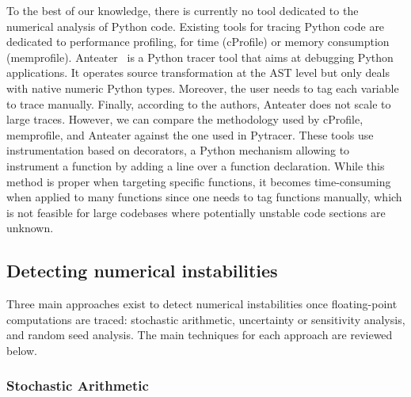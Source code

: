 \documentclass[11pt]{article}
\begin{document}
To the best of our knowledge, there is currently no tool dedicated to the numerical analysis of Python code. Existing tools for tracing Python code are dedicated to performance profiling, for time (cProfile) 
or memory consumption (memprofile). 
Anteater~\cite{faust2019anteater} is a Python tracer tool that aims at debugging Python applications. 
It operates source transformation at the AST level but only deals with native numeric Python types.
Moreover, the user needs to tag each variable to trace manually. Finally, according to the authors, Anteater does not scale to large traces.
However, we can compare the methodology used by cProfile, memprofile, and Anteater against the one used in Pytracer.
These tools use instrumentation based on decorators, a Python mechanism allowing to instrument a function by adding a line over a function declaration.
While this method is proper when targeting specific functions, it becomes time-consuming when applied to many functions since one needs to tag functions manually, which is not feasible for large codebases where potentially unstable code sections are unknown.


\label{sec:detecting-instabilities}
\subsection{Detecting numerical instabilities}

Three main approaches exist to detect numerical instabilities once floating-point computations are traced: stochastic arithmetic, uncertainty or sensitivity analysis, and random seed analysis. The main techniques for each approach are reviewed below. 


\label{sec:mca}
\subsubsection{Stochastic Arithmetic}
\end{document}
